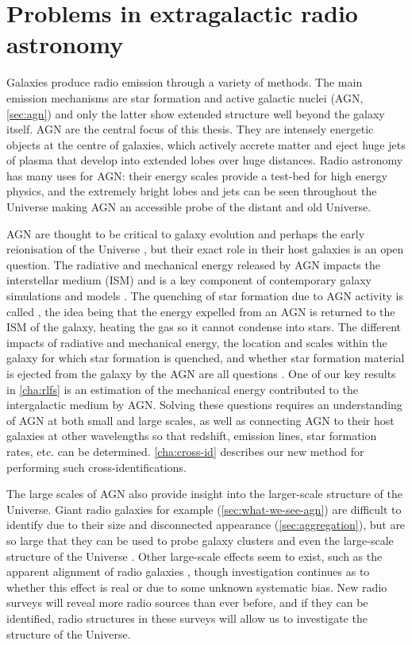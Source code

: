 \section{Problems in extragalactic radio astronomy}
\label{sec:problems-radio-astronomy}

    Galaxies produce radio emission through a variety of methods. The main emission mechanisms are star formation and active galactic nuclei (AGN, \autoref{sec:agn}) and only the latter show extended structure well beyond the galaxy itself. AGN are the central focus of this thesis. They are intensely energetic objects at the centre of galaxies, which actively accrete matter and eject huge jets of plasma that develop into extended lobes over huge distances. Radio astronomy has many uses for AGN: their energy scales provide a test-bed for high energy physics, and the extremely bright lobes and jets can be seen throughout the Universe making AGN an accessible probe of the distant and old Universe.

    AGN are thought to be critical to galaxy evolution and perhaps the early reionisation of the Universe \citep{bosch-ramon_role_2018}, but their exact role in their host galaxies is an open question. The radiative and mechanical energy released by AGN impacts the interstellar medium (ISM) and is a key component of contemporary galaxy simulations and models \citep{morganti_many_2017}. The quenching of star formation due to AGN activity is called , the idea being that the energy expelled from an AGN is returned to the ISM of the galaxy, heating the gas so it cannot condense into stars. The different impacts of radiative and mechanical energy, the location and scales within the galaxy for which star formation is quenched, and whether star formation material is ejected from the galaxy by the AGN are all questions \citep{husemann_reality_2018}. One of our key results in \autoref{cha:rlfs} is an estimation of the mechanical energy contributed to the intergalactic medium by AGN. Solving these questions requires an understanding of AGN at both small and large scales, as well as connecting AGN to their host galaxies at other wavelengths so that redshift, emission lines, star formation rates, etc. can be determined. \autoref{cha:cross-id} describes our new method for performing such cross-identifications.

    The large scales of AGN also provide insight into the larger-scale structure of the Universe. Giant radio galaxies for example (\autoref{sec:what-we-see-agn}) are difficult to identify due to their size and disconnected appearance (\autoref{sec:aggregation}), but are so large that they can be used to probe galaxy clusters \citep{banfield_radio_2016} and even the large-scale structure of the Universe \citep{reiprich_abell_2020}. Other large-scale effects seem to exist, such as the apparent alignment of radio galaxies \citep{contigiani_radio_2017,panwar_alignment_2020}, though investigation continues as to whether this effect is real or due to some unknown systematic bias. New radio surveys will reveal more radio sources than ever before, and if they can be identified, radio structures in these surveys will allow us to investigate the structure of the Universe.

